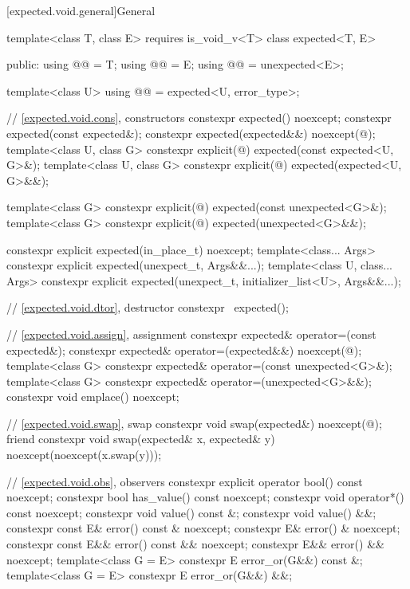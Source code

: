 [expected.void.general]{General}

\begin{codeblock}
template<class T, class E> requires is_void_v<T>
class expected<T, E> {
public:
  using @@ = T;
  using @@ = E;
  using @@ = unexpected<E>;

  template<class U>
  using @@ = expected<U, error_type>;

  // \ref{expected.void.cons}, constructors
  constexpr expected() noexcept;
  constexpr expected(const expected&);
  constexpr expected(expected&&) noexcept(@\seebelow@);
  template<class U, class G>
    constexpr explicit(@\seebelow@) expected(const expected<U, G>&);
  template<class U, class G>
    constexpr explicit(@\seebelow@) expected(expected<U, G>&&);

  template<class G>
    constexpr explicit(@\seebelow@) expected(const unexpected<G>&);
  template<class G>
    constexpr explicit(@\seebelow@) expected(unexpected<G>&&);

  constexpr explicit expected(in_place_t) noexcept;
  template<class... Args>
    constexpr explicit expected(unexpect_t, Args&&...);
  template<class U, class... Args>
    constexpr explicit expected(unexpect_t, initializer_list<U>, Args&&...);


  // \ref{expected.void.dtor}, destructor
  constexpr ~expected();

  // \ref{expected.void.assign}, assignment
  constexpr expected& operator=(const expected&);
  constexpr expected& operator=(expected&&) noexcept(@\seebelow@);
  template<class G>
    constexpr expected& operator=(const unexpected<G>&);
  template<class G>
    constexpr expected& operator=(unexpected<G>&&);
  constexpr void emplace() noexcept;

  // \ref{expected.void.swap}, swap
  constexpr void swap(expected&) noexcept(@\seebelow@);
  friend constexpr void swap(expected& x, expected& y) noexcept(noexcept(x.swap(y)));

  // \ref{expected.void.obs}, observers
  constexpr explicit operator bool() const noexcept;
  constexpr bool has_value() const noexcept;
  constexpr void operator*() const noexcept;
  constexpr void value() const &;
  constexpr void value() &&;
  constexpr const E& error() const & noexcept;
  constexpr E& error() & noexcept;
  constexpr const E&& error() const && noexcept;
  constexpr E&& error() && noexcept;
  template<class G = E> constexpr E error_or(G&&) const &;
  template<class G = E> constexpr E error_or(G&&) &&;

}
\end{codeblock}
